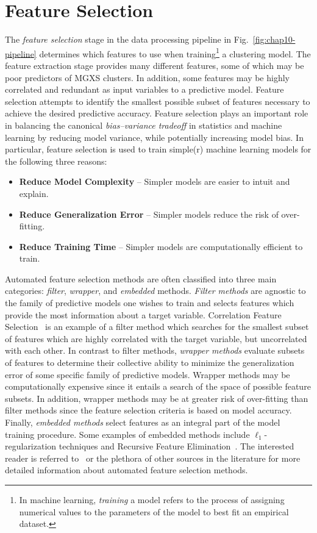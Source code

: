 \section{Feature Selection}
\label{sec:chap10-feature-select}

The \textit{feature selection} stage in the data processing pipeline in Fig.~\ref{fig:chap10-pipeline} determines which features to use when training\footnote{In machine learning, \textit{training} a model refers to the process of assigning numerical values to the parameters of the model to best fit an empirical dataset.} a clustering model. The feature extraction stage provides many different features, some of which may be poor predictors of \ac{MGXS} clusters. In addition, some features may be highly correlated and redundant as input variables to a predictive model. Feature selection attempts to identify the smallest possible subset of features necessary to achieve the desired predictive accuracy. Feature selection plays an important role in balancing the canonical \textit{bias--variance tradeoff} in statistics and machine learning by reducing model variance, while potentially increasing model bias. In particular, feature selection is used to train simple(r) machine learning models for the following three reasons:

\begin{itemize}[noitemsep]
\item \textbf{Reduce Model Complexity} -- Simpler models are easier to intuit and explain.
\item \textbf{Reduce Generalization Error} -- Simpler models reduce the risk of over-fitting.
\item \textbf{Reduce Training Time} -- Simpler models are computationally efficient to train.
\end{itemize}

Automated feature selection methods are often classified into three main categories: \textit{filter}, \textit{wrapper}, and \textit{embedded} methods. \textit{Filter methods} are agnostic to the family of predictive models one wishes to train and selects features which provide the most information about a target variable. Correlation Feature Selection~\cite{hall1999correlation} is an example of a filter method which searches for the smallest subset of features which are highly correlated with the target variable, but uncorrelated with each other. In contrast to filter methods, \textit{wrapper methods} evaluate subsets of features to determine their collective ability to minimize the generalization error of some specific family of predictive models. Wrapper methods may be computationally expensive since it entails a search of the space of possible feature subsets. In addition, wrapper methods may be at greater risk of over-fitting than filter methods since the feature selection criteria is based on model accuracy. Finally, \textit{embedded methods} select features as an integral part of the model training procedure. Some examples of embedded methods include $\ell_{1}$-regularization techniques and Recursive Feature Elimination~\cite{guyon2002rfe}. The interested reader is referred to~\cite{guyon2003select} or the plethora of other sources in the literature for more detailed information about automated feature selection methods.

